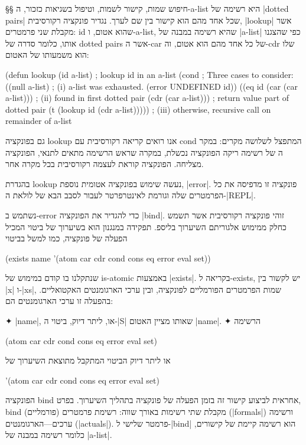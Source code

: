 §§ חיפוש שמות, קישור לשמות, וטיפול בשגיאות
כזכור, ה-a-list היא רשימה של \E|dotted pairs| שכל אחד מהם הוא קישור בין שם לערך.
נגדיר פונקציה רקורסיבית, \E|lookup| אשר מקבלת שני פרמטרים: id שהוא אטום,
ו-a-list, שהיא רשימה במבנה של \E|a-list| כפי שהצגנו אותו, כלומר סדרה של
dotted pairs אשר ה-car של כל אחד מהם הוא אטום, וה-cdr שלו הוא משמעותו של האטום:
\begin{KERNEL}
(defun lookup (id a-list) ; lookup id in an a-list
  (cond ; Three cases to consider:
    ((null a-list) ; (i) a-list was exhausted.
      (error UNDEFINED id))
    ((eq id (car (car a-list))) ; (ii) found in first dotted pair
      (cdr (car a-list))) ; return value part of dotted pair
    (t (lookup id (cdr a-list))))) ; (iii) otherwise, recursive call on remainder of a-list
\end{KERNEL}
גם בפונקציה lookup אנו רואים קריאה רקורסיבית עם cond המתפצל לשלושה מקרים: במקר
ה
של רשימה ריקה הפונקציה נכשלת, במקרה שראש הרשימה מתאים לתנאי, הפונקציה מצליחה.
הפונקציה קוראת לעצמה רקורסיבית בכל מקרה אחר.

בהגדרת lookup נעשה שימוש בפונקציה אטומית נוספת, \E|error|. פונקציה זו
מדפיסה את כל הפרמטרים שלה וגורמת לאינטרפרטר לעבור לסבב הבא של לולאת ה-\E|REPL|.

נשתמש ב-error כדי להגדיר את הפונקציה \E|bind|. זוהי פונקציה רקורסיבית אשר תשמש כחלק
ממימוש אלגוריתם השיערוך בליספ. תפקידה במנגנון הוא בשיערוך של ביטוי המכיל הפעלה
של פונקציה, כמו למשל בביטוי
\begin{LISP}
  (exists name '(atom car cdr cond cons eq error eval set))
\end{LISP}
שנתקלנו בו קודם במימוש של is-atomic באמצעות \E|exists|. בקריאה ל-exists,
יש לקשור בין \E|x| ו-\E|xs|, שמות הפרמטרים הפורמליים לפונקציה, ובין ערכי
הארגומנטים האקטואליים. בהפעלה זו ערכי הארגומנטים הם:
\begin{itemize}
  ✦ \E|name|, או, ליתר דיוק, ביטוי ה-\E|S| שאותו מציין האטום \E|name|.
  ✦ הרשימה
  \begin{LISP}
    (atom car cdr cond cons eq error eval set)
  \end{LISP}
  או ליתר דיוק הביטוי המתקבל מתוצאת השיערוך של
  \begin{LISP}
  '(atom car cdr cond cons eq error eval set)
  \end{LISP}
\end{itemize}

הפונקציה bind אחראית לביצוע קישור זה בזמן הפעלה של פונקציה בתהליך השיערוך.
בפרט, bind מקבלת שתי רשימות באורך שווה: רשימת פרמטרים (פורמליים) (\E|formals|)
ורשימה ערכים---הארגומנטים (\E|actuals|). פרמטר שלישי ל-\E|bind| הוא רשימה קיימת
של קישורים, כלומר רשימה במבנה של \E|a-list|.

